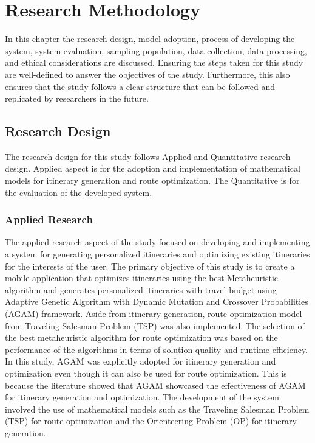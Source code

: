 \chapter{Research Methodology}
\thispagestyle{empty}

In this chapter the research design, model adoption, process of developing the system, system evaluation, sampling population, data collection, data processing, and ethical considerations are discussed. Ensuring the steps taken for this study are well-defined to answer the objectives of the study. Furthermore, this also ensures that the study follows a clear structure that can be followed and replicated by researchers in the future.

\section{Research Design}

The research design for this study follows Applied and Quantitative research design. Applied aspect is for the adoption and implementation of mathematical models for itinerary generation and route optimization. The Quantitative is for the evaluation of the developed system.

\subsection{Applied Research}
The applied research aspect of the study focused on developing and implementing a system for generating personalized itineraries and optimizing existing itineraries for the interests of the user. The primary objective of this study is to create a mobile application that optimizes itineraries using the best Metaheuristic algorithm and generates personalized itineraries with travel budget using Adaptive Genetic Algorithm with Dynamic Mutation and Crossover Probabilities (AGAM) framework. Aside from itinerary generation, route optimization model from Traveling Salesman Problem (TSP) was also implemented. The selection of the best metaheuristic algorithm for route optimization was based on the performance of the algorithms in terms of solution quality and runtime efficiency. In this study, AGAM was explicitly adopted for itinerary generation and optimization even though it can also be used for route optimization. This is because the literature showed that AGAM showcased the effectiveness of AGAM for itinerary generation and optimization. The development of the system involved the use of mathematical models such as the Traveling Salesman Problem (TSP) for route optimization and the Orienteering Problem (OP) for itinerary generation.

